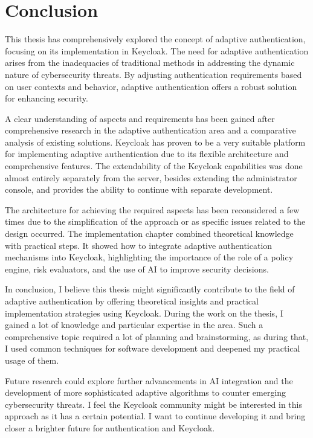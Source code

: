 \chapter{Conclusion} \label{conclusion}

This thesis has comprehensively explored the concept of adaptive authentication, focusing on its implementation in Keycloak.
The need for adaptive authentication arises from the inadequacies of traditional methods in addressing the dynamic nature of cybersecurity threats.
By adjusting authentication requirements based on user contexts and behavior, adaptive authentication offers a robust solution for enhancing security.

A clear understanding of aspects and requirements has been gained after comprehensive research in the adaptive authentication area and a comparative analysis of existing solutions.
Keycloak has proven to be a very suitable platform for implementing adaptive authentication due to its flexible architecture and comprehensive features.
The extendability of the Keycloak capabilities was done almost entirely separately from the server, besides extending the administrator console, and provides the ability to continue with separate development.

The architecture for achieving the required aspects has been reconsidered a few times due to the simplification of the approach or as specific issues related to the design occurred.
The implementation chapter combined theoretical knowledge with practical steps.
It showed how to integrate adaptive authentication mechanisms into Keycloak, highlighting the importance of the role of a policy engine, risk evaluators, and the use of AI to improve security decisions. 

In conclusion, I believe this thesis might significantly contribute to the field of adaptive authentication by offering theoretical insights and practical implementation strategies using Keycloak.
During the work on the thesis, I gained a lot of knowledge and particular expertise in the area.
Such a comprehensive topic required a lot of planning and brainstorming, as during that, I used common techniques for software development and deepened my practical usage of them.

Future research could explore further advancements in AI integration and the development of more sophisticated adaptive algorithms to counter emerging cybersecurity threats.
I feel the Keycloak community might be interested in this approach as it has a certain potential.
I want to continue developing it and bring closer a brighter future for authentication and Keycloak.